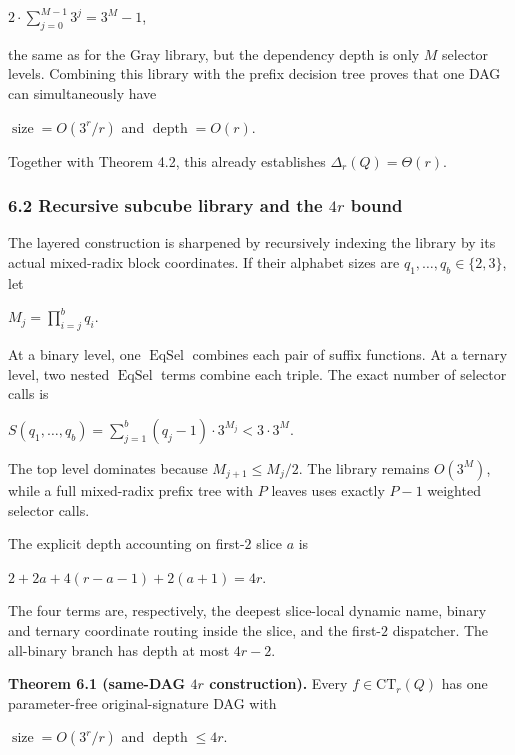 \documentclass[
  11pt,
]{article}
\theoremstyle{definition}
\theoremstyle{remark}
\begin{document}
\(2\mathbin{\cdot}\sum_{j=0}^{M-1} 3^j = 3^M-1\),

the same as for the Gray library, but the dependency depth is only \(M\)
selector levels. Combining this library with the prefix decision tree
proves that one DAG can simultaneously have

\(\operatorname{size}=O(3^r/r)\) and \(\operatorname{depth}=O(r)\).

Together with Theorem 4.2, this already establishes
\(\Delta_r(Q)=\Theta(r)\).

\hypertarget{recursive-subcube-library-and-the-4r-bound}{%
\subsubsection{\texorpdfstring{6.2 Recursive subcube library and the
\(4r\)
bound}{6.2 Recursive subcube library and the 4r bound}}\label{recursive-subcube-library-and-the-4r-bound}}

The layered construction is sharpened by recursively indexing the
library by its actual mixed-radix block coordinates. If their alphabet
sizes are \(q_1,\ldots ,q_b \in \{2,3\}\), let

\(M_j=\prod_{i=j}^b q_i\).

At a binary level, one \(\operatorname{EqSel}\) combines each pair of
suffix functions. At a ternary level, two nested
\(\operatorname{EqSel}\) terms combine each triple. The exact number of
selector calls is

\(S(q_1,\ldots ,q_b)=\sum_{j=1}^b (q_j-1)\mathbin{\cdot}3^{M_j} < 3\mathbin{\cdot}3^M\).

The top level dominates because \(M_{j+1}\le M_j/2\). The library
remains \(O(3^M)\), while a full mixed-radix prefix tree with \(P\)
leaves uses exactly \(P-1\) weighted selector calls.

The explicit depth accounting on first-\(2\) slice \(a\) is

\(2 + 2a + 4(r-a-1) + 2(a+1) = 4r\).

The four terms are, respectively, the deepest slice-local dynamic name,
binary and ternary coordinate routing inside the slice, and the
first-\(2\) dispatcher. The all-binary branch has depth at most
\(4r-2\).

\textbf{Theorem 6.1 (same-DAG \(4r\) construction).} Every
\(f \in \mathrm{CT}_r(Q)\) has one parameter-free original-signature DAG
with

\(\operatorname{size}=O(3^r/r)\) and \(\operatorname{depth}\le 4r\).
\end{document}
